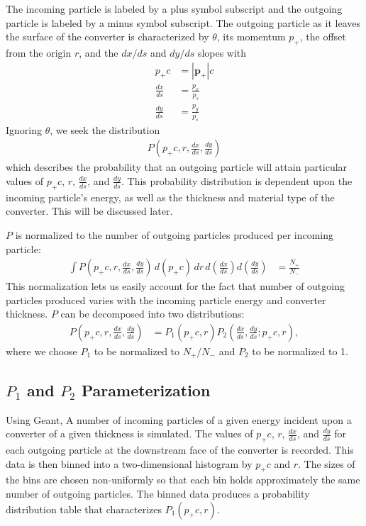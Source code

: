 \documentclass[12pt]{article}
\newcommand{\dxds}{\frac{dx}{ds}}
\newcommand{\dyds}{\frac{dy}{ds}}
\begin{document}
The incoming particle is labeled by a plus symbol subscript and the outgoing particle is labeled by
a minus symbol subscript. The outgoing particle as it leaves the surface of the converter is
characterized by $\theta$, its momentum $p_+$, the offset from the origin $r$, and the $dx/ds$ and
$dy/ds$ slopes with
\begin{align}
p_+ c & = \left| \mathbf{p}_+ \right| c \\
\dxds & = \frac{p_x}{p_s} \\
\dyds & = \frac{p_y}{p_s}
\end{align}
Ignoring $\theta$, we seek the distribution
\begin{align}
P \left( p_+ c, r, \dxds, \dyds \right)
\end{align}
which describes the probability that an outgoing particle will attain particular values of $p_+ c$,
$r$, $\dxds$, and $\dyds$. This probability distribution is dependent upon the incoming particle's
energy, as well as the thickness and material type of the converter. This will be discussed later.

$P$ is normalized to the number of outgoing particles produced per incoming particle:
\begin{align}
\int P \left( p_+ c, r, \dxds, \dyds \right) \, d(p_+ c) \, dr \, d \! \left( \dxds \right) d \! \left( \dyds \right) & = \frac{N_+}{N_-}
\end{align}
This normalization lets us easily account for the fact that number of outgoing particles produced
varies with the incoming particle energy and converter thickness. $P$ can be decomposed into two distributions:
\begin{align}
P \left( p_+ c, r, \dxds, \dyds \right) & = P_1 \left( p_+ c, r \right) P_2 \left( \dxds, \dyds ; p_+ c , r \right),
\end{align}
where we choose $P_1$ to be normalized to $N_+/N_-$ and $P_2$ to be normalized to 1.

\subsection{$P_1$ and $P_2$ Parameterization}

Using Geant\cite{geant}, A number of incoming particles of a given energy incident upon a converter
of a given thickness is simulated.  The values of $p_+ c$, $r$, $\dxds$, and $\dyds$ for each
outgoing particle at the downstream face of the converter is recorded. This data is then binned into
a two-dimensional histogram by $p_+ c$ and $r$. The sizes of the bins are chosen non-uniformly so
that each bin holds approximately the same number of outgoing particles. The binned data produces a
probability distribution table that characterizes $P_1(p_+c, r)$.
\end{document}
